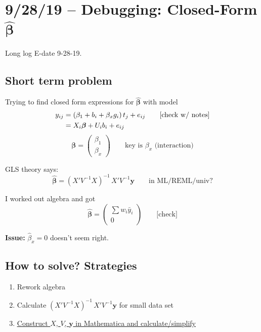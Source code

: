 \documentclass[11pt]{article}
\begin{document}
\newpage
\section{9/28/19 -- Debugging: Closed-Form
  $\hat{\bm{\beta}}$}

Long log E-date 9-28-19.

\subsection*{Short term problem}

Trying to find closed form expressions for
$\hat{\bm{\beta}}$ with model
\begin{align}
  y_{ij} &= (\beta_1 + b_i + \beta_x g_i)\,t_j + e_{ij}
  \qquad\text{[check w/ notes]} \notag \\
  &= X_i \bm{\beta} + U_i b_i + e_{ij}
\end{align}
\[
  \bm{\beta} = \begin{pmatrix} \beta_1 \\ \beta_x
    \end{pmatrix}
  \qquad \text{key is } \beta_x \text{ (interaction)}
\]

GLS theory says:
\[
  \hat{\bm{\beta}}
  = (X'V^{-1}X)^{-1}\,X'V^{-1}\mathbf{y}
  \qquad\text{in ML/REML/univ?}
\]

I worked out algebra and got
\[
  \hat{\bm{\beta}}
  = \begin{pmatrix}
      \sum w_i \bar{y}_i \\ 0
    \end{pmatrix}
  \qquad\text{[check]}
\]

\begin{mdframed}
\textbf{Issue:} $\hat{\beta}_x = 0$ doesn't seem right.
\end{mdframed}

\subsection*{How to solve? Strategies}

\begin{enumerate}
  \item Rework algebra
  \item Calculate $(X'V^{-1}X)^{-1}\,X'V^{-1}\mathbf{y}$
    for small data set
  \item \underline{\underline{Construct $X$, $V$,
    $\mathbf{y}$ in Mathematica and
    calculate/simplify}}
\end{enumerate}
\end{document}
